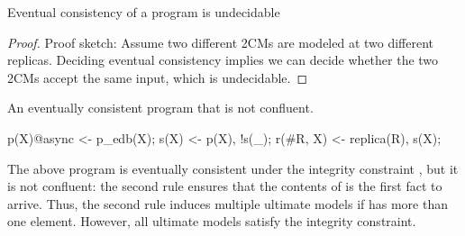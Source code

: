 
\begin{lemma}
Eventual consistency of a \lang program is undecidable
\end{lemma}
\begin{proof}
Proof sketch: Assume two different 2CMs are modeled at two different replicas.  Deciding eventual consistency implies we can decide whether the two 2CMs accept the same input, which is undecidable.
\end{proof}


\begin{example}
An eventually consistent program that is not confluent.

\begin{Dedalus}
p(X)@async <- p_edb(X);
s(X) <- p(X), !s(_);
r(#R, X) <- replica(R), s(X);
\end{Dedalus}
\end{example}

The above program is eventually consistent under the integrity constraint , but it is not confluent: the second rule ensures that the contents of  is the first  fact to arrive.  Thus, the second rule induces multiple ultimate models if  has more than one element.  However, all ultimate models satisfy the integrity constraint. 

